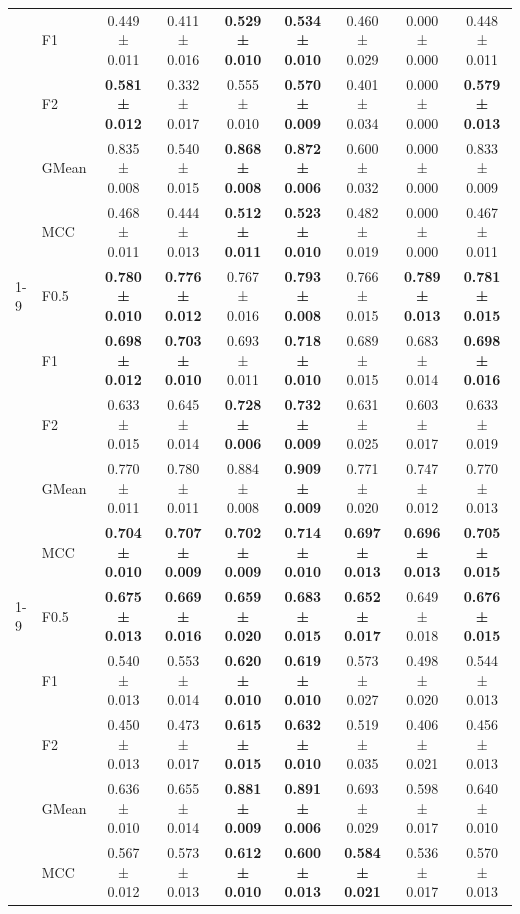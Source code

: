 \begin{table}[H]
{\begin{tabular}{llccccccc}
 & F1 & 0.449 ± 0.011 & 0.411 ± 0.016 & \textbf{0.529 ± 0.010} & \textbf{0.534 ± 0.010} & 0.460 ± 0.029 & 0.000 ± 0.000 & 0.448 ± 0.011 \\
 & F2 & \textbf{0.581 ± 0.012} & 0.332 ± 0.017 & 0.555 ± 0.010 & \textbf{0.570 ± 0.009} & 0.401 ± 0.034 & 0.000 ± 0.000 & \textbf{0.579 ± 0.013} \\
 & GMean & 0.835 ± 0.008 & 0.540 ± 0.015 & \textbf{0.868 ± 0.008} & \textbf{0.872 ± 0.006} & 0.600 ± 0.032 & 0.000 ± 0.000 & 0.833 ± 0.009 \\
 & MCC & 0.468 ± 0.011 & 0.444 ± 0.013 & \textbf{0.512 ± 0.011} & \textbf{0.523 ± 0.010} & 0.482 ± 0.019 & 0.000 ± 0.000 & 0.467 ± 0.011 \\
\cline{1-9}
\multirow[t]{5}{*}{LGBM()} & F0.5 & \textbf{0.780 ± 0.010} & \textbf{0.776 ± 0.012} & 0.767 ± 0.016 & \textbf{0.793 ± 0.008} & 0.766 ± 0.015 & \textbf{0.789 ± 0.013} & \textbf{0.781 ± 0.015} \\
 & F1 & \textbf{0.698 ± 0.012} & \textbf{0.703 ± 0.010} & 0.693 ± 0.011 & \textbf{0.718 ± 0.010} & 0.689 ± 0.015 & 0.683 ± 0.014 & \textbf{0.698 ± 0.016} \\
 & F2 & 0.633 ± 0.015 & 0.645 ± 0.014 & \textbf{0.728 ± 0.006} & \textbf{0.732 ± 0.009} & 0.631 ± 0.025 & 0.603 ± 0.017 & 0.633 ± 0.019 \\
 & GMean & 0.770 ± 0.011 & 0.780 ± 0.011 & 0.884 ± 0.008 & \textbf{0.909 ± 0.009} & 0.771 ± 0.020 & 0.747 ± 0.012 & 0.770 ± 0.013 \\
 & MCC & \textbf{0.704 ± 0.010} & \textbf{0.707 ± 0.009} & \textbf{0.702 ± 0.009} & \textbf{0.714 ± 0.010} & \textbf{0.697 ± 0.013} & \textbf{0.696 ± 0.013} & \textbf{0.705 ± 0.015} \\
\cline{1-9}
\multirow[t]{5}{*}{LogisticRegression()} & F0.5 & \textbf{0.675 ± 0.013} & \textbf{0.669 ± 0.016} & \textbf{0.659 ± 0.020} & \textbf{0.683 ± 0.015} & \textbf{0.652 ± 0.017} & 0.649 ± 0.018 & \textbf{0.676 ± 0.015} \\
 & F1 & 0.540 ± 0.013 & 0.553 ± 0.014 & \textbf{0.620 ± 0.010} & \textbf{0.619 ± 0.010} & 0.573 ± 0.027 & 0.498 ± 0.020 & 0.544 ± 0.013 \\
 & F2 & 0.450 ± 0.013 & 0.473 ± 0.017 & \textbf{0.615 ± 0.015} & \textbf{0.632 ± 0.010} & 0.519 ± 0.035 & 0.406 ± 0.021 & 0.456 ± 0.013 \\
 & GMean & 0.636 ± 0.010 & 0.655 ± 0.014 & \textbf{0.881 ± 0.009} & \textbf{0.891 ± 0.006} & 0.693 ± 0.029 & 0.598 ± 0.017 & 0.640 ± 0.010 \\
 & MCC & 0.567 ± 0.012 & 0.573 ± 0.013 & \textbf{0.612 ± 0.010} & \textbf{0.600 ± 0.013} & \textbf{0.584 ± 0.021} & 0.536 ± 0.017 & 0.570 ± 0.013 \\

\end{tabular}}
\end{table}
